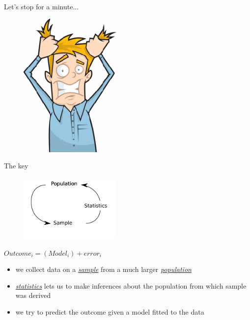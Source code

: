 \documentclass{beamer}\usepackage[]{graphicx}\usepackage[]{color}
\begin{document}
\begin{frame}
Let's stop for a minute...
\begin{center}
\begin{figure}
\includegraphics[width=5cm]{Images/frustration.png}
\end{figure}
\end{center}
\end{frame}


\begin{frame}
\begin{block}{The key}
\begin{center}
\begin{figure}
\includegraphics[width=5cm]{Images/stats.png}
\end{figure}
$Outcome_i=(Model_i)+error_i$
\end{center}
\begin{itemize}
\footnotesize
\item we collect data on a \underline{\textit{sample}} from a much larger \underline{\textit{population}}
\item \underline{\textit{statistics}} lets us to make inferences about the population from which sample was derived
\item we try to predict the outcome given a model fitted to the data
\end{itemize}
\end{block}
\end{frame}
\end{document}
